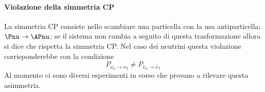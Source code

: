 \documentclass[../../main.tex]{subfiles}
\begin{document}
  \paragraph{Violazione della simmetria CP}
    La simmetria CP consiste nello scambiare una particella con la usa
    antiparticella: $\Pnu \rightarrow \APnu$; se il sistema non cambia a seguito
    di questa trasformazione allora si dice che rispetta la simmetria CP\@.
    Nel caso dei neutrini questa violazione corrisponderebbe con la condizione
    \begin{equation*}
      P_{\nu_\alpha \rightarrow \nu_\beta} \neq
      P_{\bar{\nu}_\alpha \rightarrow \bar{\nu}_\beta}
    \end{equation*}
    Al momento ci sono diversi esperimenti in corso che provano a rilevare
    questa asimmetria.
\end{document}
